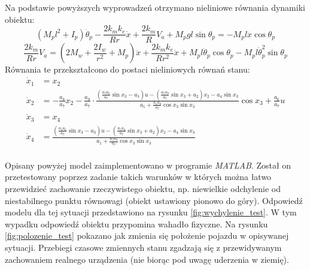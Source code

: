 Na podstawie powyższych wyprowadzeń otrzymano nieliniowe równania dynamiki obiektu:
\begin{equation}
(M_pl^2+I_p)\ddot \theta_p-\frac{2k_mk_e}{Rr}\dot{x}+\frac{2k_m}{R}V_a+M_pgl\sin \theta_p=-M_pl\ddot x\cos \theta_p
\end{equation}
\begin{equation}
\frac{2k_m}{Rr}V_a=(2M_w+\frac{2I_w}{r^2}+M_p)\ddot x+\frac{2k_mk_e}{Rr^2}\dot x+M_pl\ddot \theta_p\cos \theta_p-M_pl\dot \theta_p^2\sin \theta_p
\end{equation}
Równania te przekształcono do postaci nieliniowych równań stanu:
\begin{equation}
\begin{aligned}
\dot x_1 &= x_2\\
\dot x_2 &= -\frac{a_8}{a_7}x_2-\frac{a_9}{a_7}\cdot \frac{(\frac{a_5a_6}{a_7}\sin x_3-a_3)u-(\frac{a_5a_8}{a_7}\sin x_3+a_2)x_2-a_4\sin x_3}{a_1+\frac{a_5a_9}{a_7}\cos x_3\sin x_3}\cos x_3+\frac{a_6}{a_7}u\\
\dot x_3 &= x_4\\
\dot x_4 &= \frac{(\frac{a_5a_6}{a_7}\sin x_3 -a_3)u-(\frac{a_5a_8}{a_7}\sin x_3+a_2)x_2-a_4\sin x_3}{a_1+\frac{a_5a_9}{a_7}\cos x_3\sin x_3}
\end{aligned}
\label{eq:nonlinear_ss}
\end{equation}

\paragraph*{}
Opisany powyżej model zaimplementowano w programie \textit{MATLAB}. Został on przetestowany poprzez zadanie takich warunków w których można łatwo przewidzieć zachowanie rzeczywistego obiektu, np. niewielkie odchylenie od niestabilnego punktu równowagi (obiekt ustawiony pionowo do góry). Odpowiedź modelu dla tej sytuacji przedstawiono na rysunku \ref{fig:wychylenie_test}. W tym wypadku odpowiedź obiektu przypomina wahadło fizyczne. Na rysunku \ref{fig:polozenie_test} pokazano jak zmienia się położenie pojazdu w opisywanej sytuacji. Przebiegi czasowe zmiennych stanu zgadzają się z przewidywanym zachowaniem realnego urządzenia (nie biorąc pod uwagę uderzenia w ziemię).

